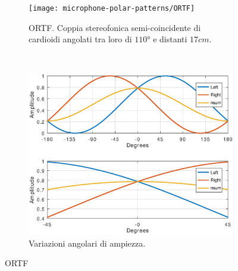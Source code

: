 \begin{figure}[t]
    \centering
    \begin{subfigure}[t]{0.99\textwidth}
        \centering
        \texttt{[image: microphone-polar-patterns/ORTF]}
        \caption{ORTF. Coppia stereofonica semi-coincidente di cardioidi angolati tra loro di $110°$ e distanti $17cm$.}%
        \label{pol:ortfsp}
    \end{subfigure}%
    \\
    \begin{subfigure}[t]{0.99\textwidth}
        \centering
        \includegraphics[width=12.5cm]{CAPITOLI/1000/IMG/ortfsub}
        \caption{Variazioni angolari di ampiezza.}%
        \label{plot:ortf}
    \end{subfigure}
    \caption{ORTF}
    \label{sp:ortf}
\end{figure}
